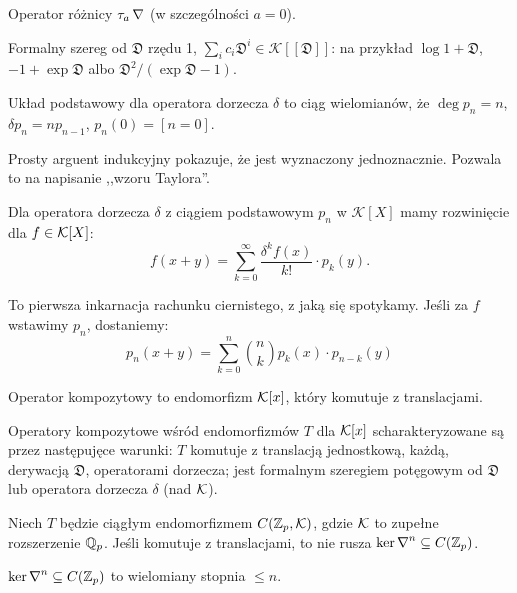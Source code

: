\begin{przyklad}
	Operator różnicy $\tau_a \operatorname{\nabla}$ (w szczególności $a = 0$).
\end{przyklad}

\begin{przyklad}
	Formalny szereg od $\mathfrak D$ rzędu 1, $\sum_i c_i \mathfrak D^i \in \mathcal K[[\mathfrak D]]$:
	na przykład $\log 1 + \mathfrak D$, $-1 + \exp \mathfrak D$ albo $\mathfrak D^2 /  (\exp \mathfrak D - 1)$.
\end{przyklad}

\begin{definicja}
	Układ podstawowy dla operatora dorzecza $\delta$ to ciąg wielomianów, że $\deg p_n = n$, $\delta p_n = n p_{n-1}$, $p_n(0) = [n = 0]$.
\end{definicja}

Prosty arguent indukcyjny pokazuje, że jest wyznaczony jednoznacznie.
Pozwala to na napisanie ,,wzoru Taylora''.

\begin{fakt}
	Dla operatora dorzecza $\delta$ z ciągiem podstawowym $p_n$ w $\mathcal K[X]$ mamy rozwinięcie dla $f \in \mathcal K[X]$:
	\[
		f(x+y) = \sum_{k=0}^\infty \frac{\delta^k f(x)}{k!} \cdot p_k (y).
	\]
\end{fakt}

To pierwsza inkarnacja rachunku ciernistego, z jaką się spotykamy. Jeśli za $f$ wstawimy $p_n$, dostaniemy:
\[
	p_n(x+y) = \sum_{k=0}^n {n \choose k} p_k(x) \cdot p_{n-k}(y)%
\]

\begin{definicja}
	Operator kompozytowy to endomorfizm $\mathcal K[x]$, który komutuje z translacjami.
\end{definicja}

\begin{fakt}
	Operatory kompozytowe wśród endomorfizmów $T$ dla $\mathcal K[x]$ scharakteryzowane są przez następujęce warunki: $T$ komutuje z translacją jednostkową, każdą, derywacją $\mathfrak D$, operatorami dorzecza; jest formalnym szeregiem potęgowym od $\mathfrak{D}$ lub operatora dorzecza $\delta$ (nad $\mathcal K$).
\end{fakt}

Niech $T$ będzie ciągłym endomorfizmem $C(\mathbb Z_p,\mathcal K)$, gdzie $\mathcal K$ to zupełne rozszerzenie $\mathbb Q_p$.
Jeśli komutuje z translacjami, to nie rusza $\ker \operatorname{\nabla}^n \subseteq C(\mathbb Z_p)$.

\begin{lemat}
	$\ker \operatorname{\nabla}^n \subseteq C(\mathbb Z_p)$ to wielomiany stopnia $\le n$.
\end{lemat}

